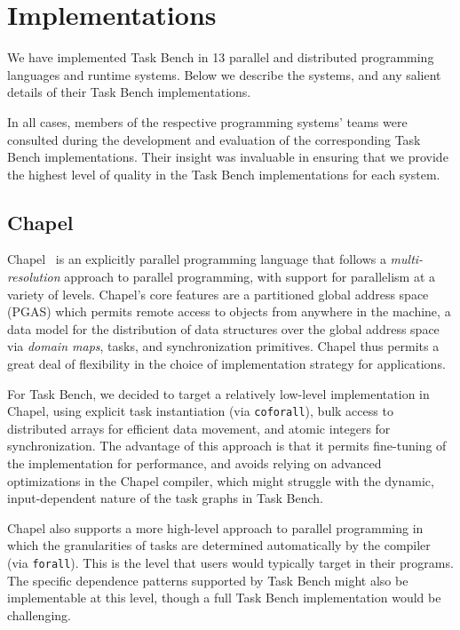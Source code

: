 \section{Implementations}
\label{sec:implementation}

We have implemented Task Bench in 13 parallel and distributed
programming languages and runtime systems. Below we describe the
systems, and any salient details of their Task Bench implementations.

In all cases, members of the respective programming systems' teams
were consulted during the development and evaluation of the
corresponding Task Bench implementations. Their insight was invaluable
in ensuring that we provide the highest level of quality in the Task
Bench implementations for each system.

\subsection{Chapel}

Chapel~\cite{Chapel07} is an explicitly parallel programming language
that follows a \emph{multi-resolution} approach to parallel
programming, with support for parallelism at a variety of
levels. Chapel's core features are a partitioned global address space
(PGAS) which permits remote access to objects from anywhere in the
machine, a data model for the distribution of data structures over the
global address space via \emph{domain maps}, tasks, and
synchronization primitives. Chapel thus permits a great deal of
flexibility in the choice of implementation strategy for applications.

For Task Bench, we decided to target a relatively low-level
implementation in Chapel, using explicit task instantiation (via
\lstinline[language=Chapel]{coforall}), bulk access to distributed
arrays for efficient data movement, and atomic integers for
synchronization. The advantage of this approach is that it permits
fine-tuning of the implementation for performance, and avoids relying
on advanced optimizations in the Chapel compiler, which might struggle
with the dynamic, input-dependent nature of the task graphs in Task
Bench.

Chapel also supports a more high-level approach to parallel
programming in which the granularities of tasks are determined
automatically by the compiler (via
\lstinline[language=Chapel]{forall}). This is the level that users
would typically target in their programs. The specific dependence
patterns supported by Task Bench might also be implementable at this
level, though a full Task Bench implementation would be challenging.

